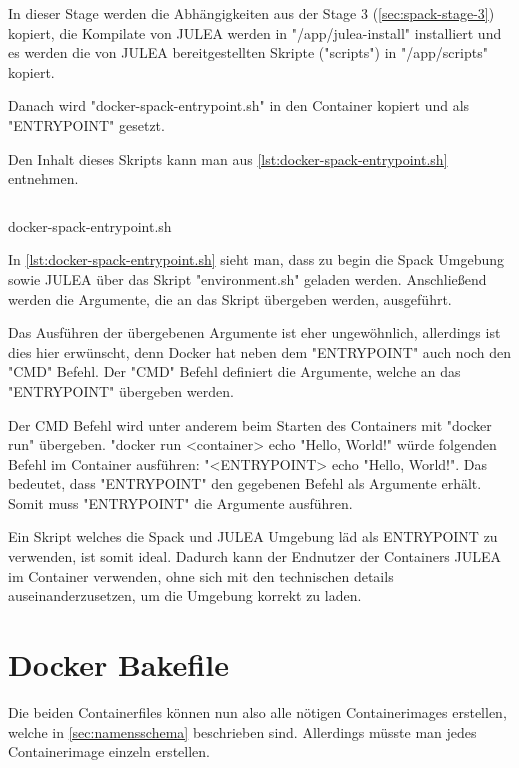 In dieser Stage werden die Abhängigkeiten aus der Stage 3 (\cref{sec:spack-stage-3}) kopiert, die Kompilate von JULEA werden in "/app/julea-install" installiert und es werden die von JULEA bereitgestellten Skripte ("scripts") in "/app/scripts" kopiert.

Danach wird "docker-spack-entrypoint.sh" in den Container kopiert und als "ENTRYPOINT" gesetzt. 

Den Inhalt dieses Skripts kann man aus \cref{lst:docker-spack-entrypoint.sh} entnehmen.

\begin{listing}[H]
    \inputminted{bash}{./code-examples/docker-spack-entrypoint.sh}
    \caption{docker-spack-entrypoint.sh}
    \label{lst:docker-spack-entrypoint.sh}
\end{listing}

In \cref{lst:docker-spack-entrypoint.sh} sieht man, dass zu begin die Spack Umgebung sowie JULEA über das Skript "environment.sh" geladen werden.
Anschließend werden die Argumente, die an das Skript übergeben werden, ausgeführt.

Das Ausführen der übergebenen Argumente ist eher ungewöhnlich, allerdings ist dies hier erwünscht, denn Docker hat neben dem "ENTRYPOINT" auch noch den "CMD" Befehl. Der "CMD" Befehl definiert die Argumente, welche an das "ENTRYPOINT" übergeben werden. 

Der CMD Befehl wird unter anderem beim Starten des Containers mit "docker run" übergeben. "docker run <container> echo "Hello, World!" würde folgenden Befehl im Container ausführen: "<ENTRYPOINT> echo "Hello, World!". Das bedeutet, dass "ENTRYPOINT" den gegebenen Befehl als Argumente erhält. Somit muss "ENTRYPOINT" die Argumente ausführen.

Ein Skript welches die Spack und JULEA Umgebung läd als ENTRYPOINT zu verwenden, ist somit ideal. Dadurch kann der Endnutzer der Containers JULEA im Container verwenden, ohne sich mit den technischen details auseinanderzusetzen, um die Umgebung korrekt zu laden.

\pagebreak

\section{Docker Bakefile}

Die beiden Containerfiles können nun also alle nötigen Containerimages erstellen, welche in \cref{sec:namensschema} beschrieben sind. Allerdings müsste man jedes Containerimage einzeln erstellen.

